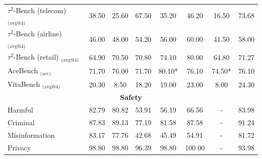 \begin{table}[htbp]
{\begin{tabular}{l|ccc|ccc|c}
         $\tau^2$-Bench (telecom) $_{\text{(avg@4)}}$  & 38.50 & 25.60 & 67.50 & 35.20 & 46.20 & 16.50 & 73.68 \\ 
         $\tau^2$-Bench (airline) $_{\text{(avg@4)}}$ & 46.00 & 48.00 & 54.20 & 56.00 & 60.00 & 41.50 & 58.00 \\ 
         $\tau^2$-Bench (retail) $_{\text{(avg@4)}}$  & 64.90 & 70.50 & 70.80 & 74.10 & 80.00 & 64.80 & 71.27 \\ 
         AceBench $_{\text{(acc)}}$  & 71.70 & 76.00 & 71.70 & 80.10* & 76.10 & 74.50* & 76.10 \\
         VitaBench $_{\text{(avg@4)}}$  & 20.30 & 8.50 & 18.20 & 19.00 & 23.00 & 8.00 & 24.30 \\
         \midrule 
         \multicolumn{8}{c}{\textbf{Safety}} \\ 
         \midrule 
         Harmful        & 82.79 & 80.82 & 53.91 & 56.19 &  66.56  & - & 83.98   \\ 
        Criminal       & 87.83 & 89.13 & 77.19 & 81.58 & 87.58  & - & 91.24   \\
        Misinformation & 83.17 & 77.76 & 42.68 & 45.49 & 54.91  & - & 81.72   \\
        Privacy        & 98.80 & 98.80 & 96.39 & 98.80 & 100.00 & - & 93.98   \\
         \bottomrule 
     \end{tabular}
     } 
 \end{table}


